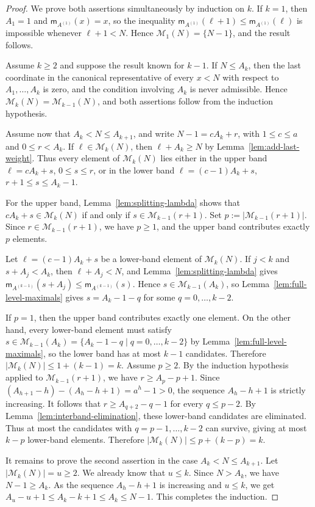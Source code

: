 \documentclass[12pt,a4paper]{amsart}
\theoremstyle{definition}
\begin{document}
\begin{proof}
We prove both assertions simultaneously by induction on $k$. If $k=1$, then $A_1=1$ and $\mathsf m_{A^{(1)}}(x)=x$, so the inequality $\mathsf m_{A^{(1)}}(\ell+1)\le\mathsf m_{A^{(1)}}(\ell)$ is impossible whenever $\ell+1<N$. Hence $\mathcal M_1(N)=\{N-1\}$, and the result follows.

Assume $k\ge 2$ and suppose the result known for $k-1$. If $N\le A_k$, then the last coordinate in the canonical representative of every $x<N$ with respect to $A_1,\ldots,A_k$ is zero, and the condition involving $A_k$ is never admissible. Hence $\mathcal M_k(N)=\mathcal M_{k-1}(N)$, and both assertions follow from the induction hypothesis.

Assume now that $A_k<N\le A_{k+1}$, and write $N-1=cA_k+r$, with $1\le c\le a$ and $0\le r<A_k$. If $\ell\in\mathcal M_k(N)$, then $\ell+A_k\ge N$ by Lemma~\ref{lem:add-last-weight}. Thus every element of $\mathcal M_k(N)$ lies either in the upper band $\ell=cA_k+s$, $0\le s\le r$, or in the lower band $\ell=(c-1)A_k+s$, $r+1\le s\le A_k-1$.

For the upper band, Lemma~\ref{lem:splitting-lambda} shows that $cA_k+s\in\mathcal M_k(N)$ if and only if $s\in\mathcal M_{k-1}(r+1)$. Set $p:=|\mathcal M_{k-1}(r+1)|$. Since $r\in\mathcal M_{k-1}(r+1)$, we have $p\ge1$, and the upper band contributes exactly $p$ elements.

Let $\ell=(c-1)A_k+s$ be a lower-band element of $\mathcal M_k(N)$. If $j<k$ and $s+A_j<A_k$, then $\ell+A_j<N$, and Lemma~\ref{lem:splitting-lambda} gives $\mathsf m_{A^{(k-1)}}(s+A_j)\le \mathsf m_{A^{(k-1)}}(s)$. Hence $s\in\mathcal M_{k-1}(A_k)$, so Lemma~\ref{lem:full-level-maximals} gives $s=A_k-1-q$ for some $q=0,\ldots,k-2$.

If $p=1$, then the upper band contributes exactly one element. On the other hand, every lower-band element must satisfy
$
s\in \mathcal M_{k-1}(A_k)=\{A_k-1-q\mid q=0,\ldots,k-2\}
$
by Lemma~\ref{lem:full-level-maximals}, so the lower band has at most $k-1$ candidates. Therefore
$
|\mathcal M_k(N)|\le 1+(k-1)=k.
$
Assume $p\ge2$. By the induction hypothesis applied to $\mathcal M_{k-1}(r+1)$, we have $r\ge A_p-p+1$. Since $(A_{h+1}-h)-(A_h-h+1)=a^h-1>0$, the sequence $A_h-h+1$ is strictly increasing. It follows that $r\ge A_{q+2}-q-1$ for every $q\le p-2$. By Lemma~\ref{lem:interband-elimination}, these lower-band candidates are eliminated. Thus at most the candidates with $q=p-1,\ldots,k-2$ can survive, giving at most $k-p$ lower-band elements. Therefore $|\mathcal M_k(N)|\le p+(k-p)=k$.

It remains to prove the second assertion in the case $A_k<N\le A_{k+1}$. Let $|\mathcal M_k(N)|=u\ge2$. We already know that $u\le k$. Since $N>A_k$, we have $N-1\ge A_k$. As the sequence $A_h-h+1$ is increasing and $u\le k$, we get $A_u-u+1\le A_k-k+1\le A_k\le N-1$. This completes the induction.
\end{proof}
\end{document}
